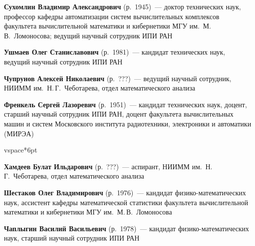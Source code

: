 \begin{multicols}{2}
\vspace*{9pt}

\noindent
\textbf{Сухомлин Владимир Александрович} (р.\ 1945)~--- доктор технических наук,
профессор кафедры автоматизации сис\-тем вычислительных комплексов\linebreak
факультета вычислительной
математики и кибернетики МГУ им.\ М.\,В.~Ломоносова;
ведущий научный сотрудник ИПИ РАН


\vspace*{9pt}





\noindent
\textbf{Ушмаев Олег Станиславович} (р.\ 1981)~---  кандидат
технических наук, ведущий научный сотрудник ИПИ РАН

\vspace*{9pt}


\noindent
\textbf{Чупрунов Алексей Николаевич} (р.\ ???)~---
ведущий научный сотрудник, НИИММ им.~Н.\,Г.~Чеботарева,
отдел математического анализа


\noindent
\textbf{Френкель Сергей Лазоревич} (р.\ 1951)~---  кандидат\linebreak
технических наук, 
доцент, старший научный сотрудник ИПИ РАН, доцент факультета 
вы\-чис\-ли\-тель\-ных машин и систем Московского института радиотехники,
электроники и автоматики (\mbox{МИРЭА})%

vspace*{6pt}

\noindent
\textbf{Хамдеев Булат Ильдарович} (р.\   ???)~---
аспирант, НИИММ им.~Н.\,Г.~Чеботарева, отдел математического анализа

\vspace*{6pt}

\noindent
\textbf{Шестаков Олег Владимирович} (р.\ 1976)~--- кандидат физико-математических наук,
ассистент ка\-фед\-ры математической статистики факультета вычислительной математики и кибернетики
МГУ им.~М.\,В.~Ломоносова


\noindent
\textbf{Чаплыгин Василий Васильевич} (р.\ 1978)~---  кандидат 
физико-математических наук, старший научный сотрудник ИПИ РАН
\end{multicols}